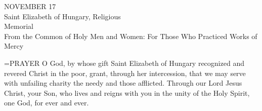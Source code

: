 \begin{center}\normalsize NOVEMBER 17\\
\footnotesize Saint Elizabeth of Hungary, Religious\\
\footnotesize Memorial\\
\footnotesize From the Common of Holy Men and Women: For Those Who Practiced Works of Mercy\\
\end{center}

\hangindent=\parindent \small{PRAYER 
O God, by whose gift Saint Elizabeth of Hungary
recognized and revered Christ in the poor,
grant, through her intercession,
that we may serve with unfailing charity
the needy and those afflicted.
Through our Lord Jesus Christ, your Son,
who lives and reigns with you in the unity of the Holy Spirit,
one God, for ever and ever.\\}
 

